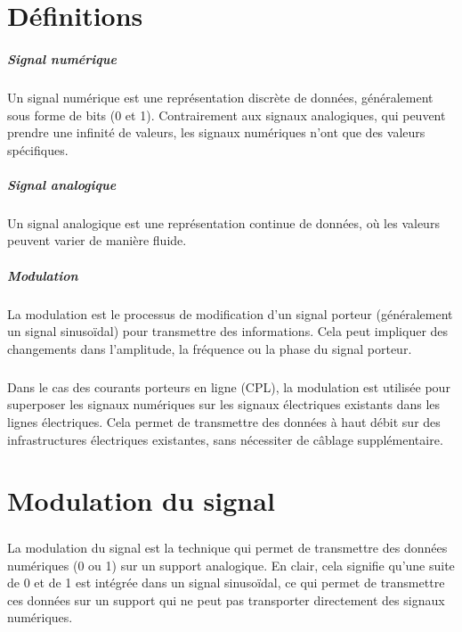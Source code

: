 \documentclass[a4paper,twocolumn]{report}
\begin{document}
\appendix
\chapter{Définitions}
\paragraph{Signal numérique} Un signal numérique est une représentation discrète
de données, généralement sous forme de bits (0 et 1). Contrairement aux signaux analogiques,
qui peuvent prendre une infinité de valeurs, les signaux numériques n'ont que des valeurs spécifiques.
\paragraph{Signal analogique} Un signal analogique est une représentation continue de données,
où les valeurs peuvent varier de manière fluide.
\paragraph{Modulation} La modulation est le processus de modification d'un signal porteur
(généralement un signal sinusoïdal) pour transmettre des informations.
Cela peut impliquer des changements dans l'amplitude, la fréquence ou la phase du signal porteur.



\paragraph{}Dans le cas des courants porteurs en ligne (CPL), la modulation est utilisée 
pour superposer les signaux numériques sur les signaux électriques existants dans les lignes électriques.
Cela permet de transmettre des données à haut débit sur des infrastructures électriques existantes,
sans nécessiter de câblage supplémentaire.
\chapter{Modulation du signal}

\paragraph{}La modulation du signal est la technique qui permet de transmettre
des données numériques (0 ou 1) sur un support analogique.
En clair, cela signifie qu'une suite de 0 et de 1 est intégrée dans un signal sinusoïdal,
ce qui permet de transmettre ces données sur un support qui ne peut pas transporter directement des signaux numériques. 
\end{document}
